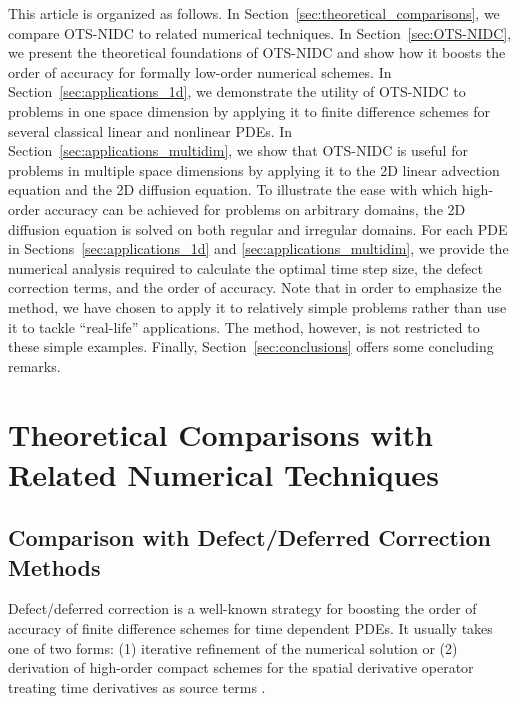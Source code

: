 \documentclass[fleqn,12pt,twoside]{article}
\begin{document}
This article is organized as follows.
In Section~\ref{sec:theoretical_comparisons}, we compare OTS-NIDC to 
related numerical techniques.
In Section~\ref{sec:OTS-NIDC}, we present the theoretical foundations of 
OTS-NIDC and show how it boosts the order of accuracy for formally
low-order numerical schemes.  
In Section~\ref{sec:applications_1d}, we demonstrate the utility of 
OTS-NIDC to problems in one space dimension by applying it to finite 
difference schemes for several classical linear and nonlinear PDEs.  
In Section~\ref{sec:applications_multidim}, we show that 
OTS-NIDC is useful for problems in multiple space dimensions by applying
it to the 2D linear advection equation and the 2D diffusion equation.  To
illustrate the ease with which high-order accuracy can be achieved for
problems on arbitrary domains, the 2D diffusion equation is solved on both
regular and irregular domains.  For each PDE in
Sections~\ref{sec:applications_1d} and \ref{sec:applications_multidim}, we
provide the numerical analysis required to calculate the optimal time step
size, the defect correction terms, and the order of accuracy.  Note that in
order to emphasize the method, we have chosen to apply it to relatively simple
problems rather than use it to tackle ``real-life'' applications.  The method,
however, is not restricted to these simple examples.  Finally, 
Section~\ref{sec:conclusions} offers some concluding remarks.


\section{Theoretical Comparisons with Related Numerical Techniques
         \label{sec:theoretical_comparisons}}

\subsection{Comparison with Defect/Deferred Correction Methods}
Defect/deferred correction is a well-known strategy for boosting the order of 
accuracy of finite difference schemes for time dependent PDEs.  It usually 
takes one of two forms: 
(1) iterative refinement of the numerical
solution \cite{pereyra_1968,stetter_1978,gustafsson_2002,kress_2002,kress_2006}
or 
(2) derivation of high-order compact schemes for the spatial derivative 
operator treating time derivatives as source 
terms \cite{spotz_2001,ito_2005,heidenreich_2007}. 
\end{document}
